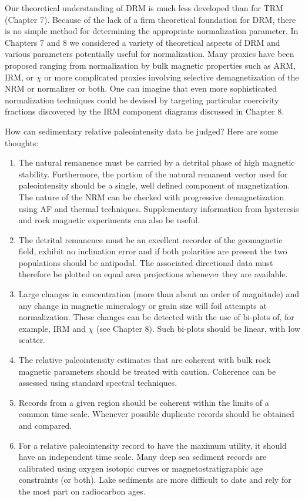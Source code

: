 Our theoretical understanding of DRM is much less developed than for TRM
(Chapter  7).  Because of the  lack of a firm theoretical foundation for
DRM, there is no simple method for determining  the appropriate normalization parameter.  In Chapters  7  and 8 we considered a variety of theoretical aspects of DRM and various parameters potentially useful for normalization.  Many proxies
have been proposed  ranging from normalization by bulk magnetic properties such as ARM, IRM, or  $\chi$ or more complicated proxies involving selective demagnetization of the NRM or normalizer or both.    One can imagine that even more sophisticated normalization techniques could be devised by targeting particular coercivity fractions discovered by the IRM component diagrams discussed in Chapter 8.  

How can sedimentary relative paleointensity data be judged?  Here  are some thoughts:


\begin{enumerate}
\item The natural remanence must be carried by a detrital phase of high magnetic stability.
 Furthermore, the portion of the natural remanent
vector used for paleointensity should be  a single, well defined component of
magnetization.   The nature of the NRM can be checked with progressive demagnetization using AF and thermal techniques.  Supplementary information from hysteresis and rock magnetic experiments can also be useful. 

\item  The detrital remanence must be an excellent recorder of the geomagnetic field, exhibit no inclination error and if both polarities are present the two populations should be antipodal.   The associated directional data must therefore be plotted on equal area projections whenever they are available.   

\item Large changes in concentration (more than about an order of magnitude) and any change in    magnetic mineralogy  or  grain size will foil attempts at normalization.   These changes can be detected with the use of bi-plots of, for example, IRM and $\chi$ (see Chapter 8).  Such bi-plots should be linear, with low scatter.


\item The relative paleointensity estimates that are coherent with bulk rock
magnetic parameters should be treated with caution.  Coherence can be assessed using standard spectral techniques.  

\item  Records from a given region should be coherent within the limits of a common time
scale.   Whenever possible duplicate records should be obtained and compared. 

\item For a relative paleointensity record to have the maximum utility, it should have an independent time scale.  Many deep sea sediment records are calibrated using oxygen isotopic curves or magnetostratigraphic age constraints (or both).  Lake sediments are more difficult to date and rely for the most part on radiocarbon ages.  
\end{enumerate}


